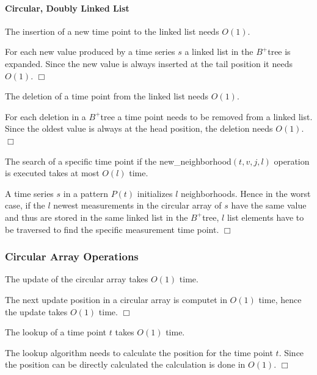 \documentclass[abstracton,12pt]{scrreprt}
\newenvironment{proof}
  {\noindent{\bf Proof:\rm}}{\hfill$\Box$\vspace{\medskipamount}}
\begin{document}
\paragraph{Circular, Doubly Linked List}
\begin{mydef}
	The insertion of a new time point to the linked list needs $O(1)$.
\end{mydef}
\begin{proof}
	For each new value produced by a time series $s$ a linked list in the $B^+$tree is expanded. Since the new value is always inserted at the tail position it needs $O(1)$.
\end{proof}
\begin{mydef}
	The deletion of a time point from the linked list needs $O(1)$.
\end{mydef}
\begin{proof}
	For each deletion in a $B^+$tree a time point needs to be removed from a linked list. Since the oldest value is always at the head position, the deletion needs $O(1)$.
\end{proof}
\begin{mydef}
	The search of a specific time point if the new\_neighborhood$(t,v,j,l)$ operation is executed takes at most $O(l)$ time.
\end{mydef}
\begin{proof}
	A time series $s$ in a pattern $P(t)$ initializes $l$ neighborhoods. Hence in the worst case, if the $l$ newest measurements in the circular array of $s$ have the same value and thus are stored in the same linked list in the $B^+$tree, $l$ list elements have to be traversed to find the specific measurement time point. 
\end{proof}

\subsubsection{Circular Array Operations}
\begin{mydef}
	The update of the circular array takes $O(1)$ time.
\end{mydef}
\begin{proof}
	The next update position in a circular array is computet in $O(1)$ time, hence the update takes $O(1)$ time. 
\end{proof}
\begin{mydef}
	The lookup of a time point $t$ takes $O(1)$ time.
\end{mydef}
\begin{proof}
	The lookup algorithm needs to calculate the position for the time point $t$. Since the position can be directly calculated the calculation is done in $O(1)$.
\end{proof}
\end{document}
